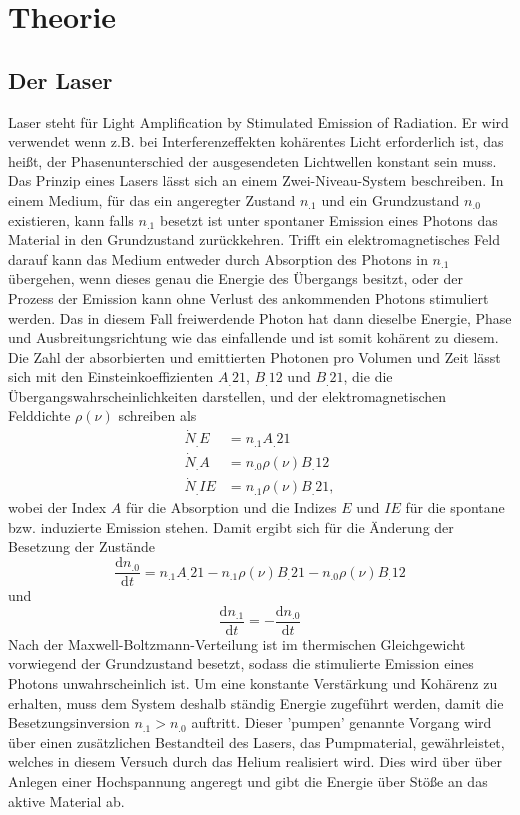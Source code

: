 \section{Theorie}
\label{sec:Theorie}

\subsection{Der Laser}
Laser steht für Light Amplification by Stimulated Emission of Radiation. Er wird verwendet wenn z.B. bei Interferenzeffekten kohärentes Licht erforderlich ist, das heißt, der Phasenunterschied der ausgesendeten Lichtwellen konstant sein muss.\\
Das Prinzip eines Lasers lässt sich an einem Zwei-Niveau-System beschreiben.
In einem Medium, für das ein angeregter Zustand $n_.1$ und ein Grundzustand $n_.0$ existieren, kann falls $n_.1$ besetzt ist unter spontaner Emission eines Photons das Material in den Grundzustand zurückkehren.
Trifft ein elektromagnetisches Feld darauf kann das Medium entweder durch Absorption des Photons in $n_.1$ übergehen, wenn dieses genau die Energie des Übergangs besitzt, oder der Prozess der Emission kann ohne Verlust des ankommenden Photons stimuliert werden. Das in diesem Fall freiwerdende Photon hat dann dieselbe Energie, Phase und Ausbreitungsrichtung wie das einfallende und ist somit kohärent zu diesem.
Die Zahl der absorbierten und emittierten Photonen pro Volumen und Zeit lässt sich mit den Einsteinkoeffizienten $A_.{21}$, $B_.{12}$ und $B_.{21}$, die die Übergangswahrscheinlichkeiten darstellen, und der elektromagnetischen Felddichte $\rho(\nu)$ schreiben als
\begin{align*}
\dot{N}_.E&=n_.1  A_.{21}\\
\dot{N}_.A&=n_.0 \rho(\nu) B_.{12}\\
\dot{N}_.{IE}&=n_.1 \rho(\nu) B_.{21},
\end{align*}
wobei der Index $A$ für die Absorption und die Indizes $E$ und $IE$ für die spontane bzw. induzierte Emission stehen.
Damit ergibt sich für die Änderung der Besetzung der Zustände
\[
\frac{\mathrm{d}n_.0}{\mathrm{d}t}=n_.1A_.{21}-n_.1 \rho(\nu) B_.{21}-n_.0 \rho(\nu) B_.{12}
\]
und 
\[
\frac{\mathrm{d}n_.1}{\mathrm{d}t}=-\frac{\mathrm{d}n_.0}{\mathrm{d}t}
\]
Nach der Maxwell-Boltzmann-Verteilung ist im thermischen Gleichgewicht vorwiegend der Grundzustand besetzt, sodass die stimulierte Emission eines Photons unwahrscheinlich ist.
Um eine konstante Verstärkung und Kohärenz zu erhalten, muss dem System deshalb ständig Energie zugeführt werden, damit die Besetzungsinversion $n_.1>n_.0$ auftritt. Dieser 'pumpen' genannte Vorgang wird über einen zusätzlichen Bestandteil des Lasers, das Pumpmaterial, gewährleistet, welches in diesem Versuch durch das Helium realisiert wird. Dies wird über über Anlegen einer Hochspannung angeregt und gibt die Energie über Stöße an das aktive Material ab.\\
